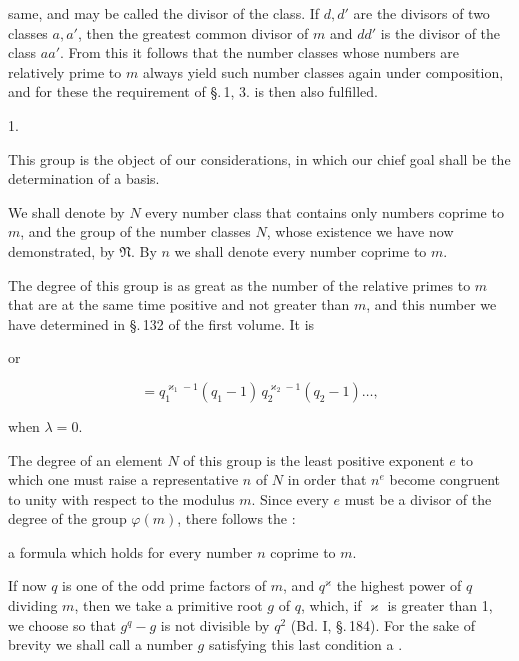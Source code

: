 same, and may be called the divisor of the class. If $d, d'$ are the divisors of two classes $a, a'$, then the greatest common divisor of $m$ and $dd'$ is the divisor of the class $aa'$. From this it follows that the number classes whose numbers are relatively prime to $m$ always yield such number classes again under composition, and for these the requirement of \S.\,1, 3. is then also fulfilled.

1.\ 

This group is the object of our considerations, in which our chief goal shall be the determination of a basis.

We shall denote by $N$ every number class that contains only numbers coprime to $m$, and the group of the number classes $N$, whose existence we have now demonstrated, by $\mathfrak{N}$. By $n$ we shall denote every number coprime to $m$.

The degree of this group is as great as the number of the relative primes to $m$ that are at the same time positive and not greater than $m$, and this number we have determined in \S.\,132 of the first volume. It is


or

\[
= q_1^{\varkappa_1 - 1}(q_1 - 1)\, q_2^{\varkappa_2 - 1}(q_2 - 1) \ldots,
\]

when $\lambda = 0$.

The degree of an element $N$ of this group is the least positive exponent $e$ to which one must raise a representative $n$ of $N$ in order that $n^e$ become congruent to unity with respect to the modulus $m$. Since every $e$ must be a divisor of the degree of the group $\varphi(m)$, there follows the :


a formula which holds for every number $n$ coprime to $m$.

If now $q$ is one of the odd prime factors of $m$, and $q^\varkappa$ the highest power of $q$ dividing $m$, then we take a primitive root $g$ of $q$, which, if $\varkappa$ is greater than 1, we choose so that $g^q - g$ is not divisible by $q^2$ (Bd. I, \S.\,184). For the sake of brevity we shall call a number $g$ satisfying this last condition a .
